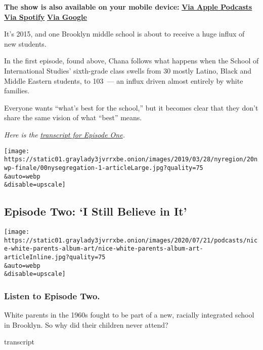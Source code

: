 \textbf{The show is also available on your mobile device:}
\textbf{\href{https://podcasts.apple.com/us/podcast/nice-white-parents/id1524080195}{Via
Apple Podcasts}} \textbf{\textbar{}}
\textbf{\href{https://open.spotify.com/show/7oBSLCZFCgpdCaBjIG8mLV?si=YcEPLD3xT2ejXmpQz-tRpw}{Via
Spotify}} \textbf{\textbar{}}
\textbf{\href{https://podcasts.google.com/feed/aHR0cHM6Ly9yc3MuYXJ0MTkuY29tL25pY2Utd2hpdGUtcGFyZW50cw}{Via
Google}}

It's 2015, and one Brooklyn middle school is about to receive a huge
influx of new students.

In the first episode, found above, Chana follows what happens when the
School of International Studies' sixth-grade class swells from 30 mostly
Latino, Black and Middle Eastern students, to 103~--- an influx driven
almost entirely by white families.

Everyone wants ``what's best for the school,'' but it becomes clear that
they don't share the same vision of what ``best'' means.

\emph{Here is the}
\href{https://www.nytimes3xbfgragh.onion/2020/07/30/podcasts/nice-white-parents-serial.html?showTranscript=1}{\emph{transcript
for Episode One}}\emph{.}

\texttt{[image: https://static01.graylady3jvrrxbe.onion/images/2019/03/28/nyregion/20nwp-finale/00nysegregation-1-articleLarge.jpg?quality=75\\\&auto=webp\\\&disable=upscale]}

\hypertarget{episode-two-i-still-believe-in-it}{%
\subsection{Episode Two: `I Still Believe in
It'}\label{episode-two-i-still-believe-in-it}}

\texttt{[image: https://static01.graylady3jvrrxbe.onion/images/2020/07/21/podcasts/nice-white-parents-album-art/nice-white-parents-album-art-articleInline.jpg?quality=75\\\&auto=webp\\\&disable=upscale]}

\hypertarget{listen-to-episode-two}{%
\subsubsection{Listen to Episode Two.}\label{listen-to-episode-two}}

White parents in the 1960s fought to be part of a new, racially
integrated school in Brooklyn. So why did their children never attend?

transcript

